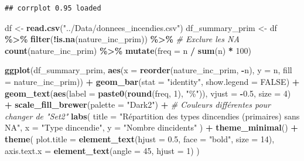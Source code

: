 \documentclass[
]{article}
\newenvironment{Shaded}{\begin{snugshade}}{\end{snugshade}}
\newcommand{\AttributeTok}[1]{\textcolor[rgb]{0.13,0.29,0.53}{#1}}
\newcommand{\CommentTok}[1]{\textcolor[rgb]{0.56,0.35,0.01}{\textit{#1}}}
\newcommand{\ConstantTok}[1]{\textcolor[rgb]{0.56,0.35,0.01}{#1}}
\newcommand{\DecValTok}[1]{\textcolor[rgb]{0.00,0.00,0.81}{#1}}
\newcommand{\FloatTok}[1]{\textcolor[rgb]{0.00,0.00,0.81}{#1}}
\newcommand{\FunctionTok}[1]{\textcolor[rgb]{0.13,0.29,0.53}{\textbf{#1}}}
\newcommand{\NormalTok}[1]{#1}
\newcommand{\OtherTok}[1]{\textcolor[rgb]{0.56,0.35,0.01}{#1}}
\newcommand{\SpecialCharTok}[1]{\textcolor[rgb]{0.81,0.36,0.00}{\textbf{#1}}}
\newcommand{\StringTok}[1]{\textcolor[rgb]{0.31,0.60,0.02}{#1}}
\begin{document}
\begin{verbatim}
## corrplot 0.95 loaded
\end{verbatim}

\begin{Shaded}
\begin{Highlighting}[]
\NormalTok{df }\OtherTok{\textless{}{-}} \FunctionTok{read.csv}\NormalTok{(}\StringTok{"../Data/donnees\_incendies.csv"}\NormalTok{)}
\NormalTok{df\_summary\_prim }\OtherTok{\textless{}{-}}\NormalTok{ df }\SpecialCharTok{\%\textgreater{}\%} 
  \FunctionTok{filter}\NormalTok{(}\SpecialCharTok{!}\FunctionTok{is.na}\NormalTok{(nature\_inc\_prim)) }\SpecialCharTok{\%\textgreater{}\%}  \CommentTok{\# Exclure les NA}
  \FunctionTok{count}\NormalTok{(nature\_inc\_prim) }\SpecialCharTok{\%\textgreater{}\%}
  \FunctionTok{mutate}\NormalTok{(}\AttributeTok{freq =}\NormalTok{ n }\SpecialCharTok{/} \FunctionTok{sum}\NormalTok{(n) }\SpecialCharTok{*} \DecValTok{100}\NormalTok{)}

\FunctionTok{ggplot}\NormalTok{(df\_summary\_prim, }\FunctionTok{aes}\NormalTok{(}\AttributeTok{x =} \FunctionTok{reorder}\NormalTok{(nature\_inc\_prim, }\SpecialCharTok{{-}}\NormalTok{n), }\AttributeTok{y =}\NormalTok{ n, }\AttributeTok{fill =}\NormalTok{ nature\_inc\_prim)) }\SpecialCharTok{+} 
  \FunctionTok{geom\_bar}\NormalTok{(}\AttributeTok{stat =} \StringTok{"identity"}\NormalTok{, }\AttributeTok{show.legend =} \ConstantTok{FALSE}\NormalTok{) }\SpecialCharTok{+}
  \FunctionTok{geom\_text}\NormalTok{(}\FunctionTok{aes}\NormalTok{(}\AttributeTok{label =} \FunctionTok{paste0}\NormalTok{(}\FunctionTok{round}\NormalTok{(freq, }\DecValTok{1}\NormalTok{), }\StringTok{"\%"}\NormalTok{)), }\AttributeTok{vjust =} \SpecialCharTok{{-}}\FloatTok{0.5}\NormalTok{, }\AttributeTok{size =} \DecValTok{4}\NormalTok{) }\SpecialCharTok{+}
  \FunctionTok{scale\_fill\_brewer}\NormalTok{(}\AttributeTok{palette =} \StringTok{"Dark2"}\NormalTok{) }\SpecialCharTok{+} \CommentTok{\# Couleurs différentes pour changer de "Set2"}
  \FunctionTok{labs}\NormalTok{(}
    \AttributeTok{title =} \StringTok{"Répartition des types d\textquotesingle{}incendies (primaires) sans NA"}\NormalTok{, }
    \AttributeTok{x =} \StringTok{"Type d\textquotesingle{}incendie"}\NormalTok{,}
    \AttributeTok{y =} \StringTok{"Nombre d\textquotesingle{}incidents"}
\NormalTok{  ) }\SpecialCharTok{+}
  \FunctionTok{theme\_minimal}\NormalTok{() }\SpecialCharTok{+}
  \FunctionTok{theme}\NormalTok{(}
    \AttributeTok{plot.title =} \FunctionTok{element\_text}\NormalTok{(}\AttributeTok{hjust =} \FloatTok{0.5}\NormalTok{, }\AttributeTok{face =} \StringTok{"bold"}\NormalTok{, }\AttributeTok{size =} \DecValTok{14}\NormalTok{),}
    \AttributeTok{axis.text.x =} \FunctionTok{element\_text}\NormalTok{(}\AttributeTok{angle =} \DecValTok{45}\NormalTok{, }\AttributeTok{hjust =} \DecValTok{1}\NormalTok{)}
\NormalTok{  )}
\end{Highlighting}
\end{Shaded}
\end{document}
